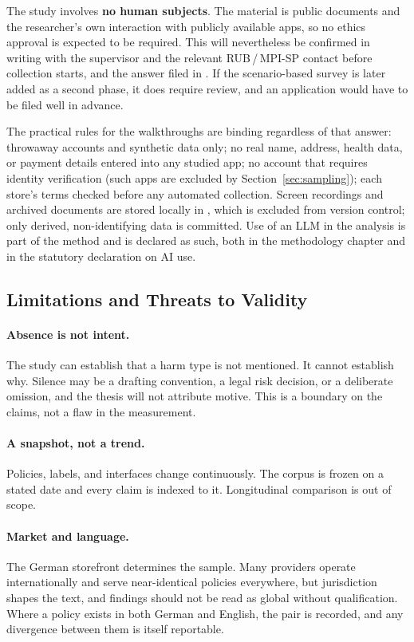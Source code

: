 The study involves \textbf{no human subjects}. The material is public documents
and the researcher's own interaction with publicly available apps, so no ethics
approval is expected to be required. This will nevertheless be confirmed in
writing with the supervisor and the relevant RUB\,/\,MPI-SP contact before
collection starts, and the answer filed in . If the
scenario-based survey is later added as a second phase, it does require review,
and an application would have to be filed well in advance.

The practical rules for the walkthroughs are binding regardless of that answer:
throwaway accounts and synthetic data only; no real name, address, health data,
or payment details entered into any studied app; no account that requires
identity verification (such apps are excluded by
Section~\ref{sec:sampling}); each store's terms checked before any automated
collection. Screen recordings and archived documents are stored locally in
, which is excluded from version control; only derived,
non-identifying data is committed. Use of an LLM in the analysis is part of the
method and is declared as such, both in the methodology chapter and in the
statutory declaration on AI use.

\subsection{Limitations and Threats to Validity}

\paragraph{Absence is not intent.}
The study can establish that a harm type is not mentioned. It cannot establish
why. Silence may be a drafting convention, a legal risk decision, or a
deliberate omission, and the thesis will not attribute motive. This is a
boundary on the claims, not a flaw in the measurement.

\paragraph{A snapshot, not a trend.}
Policies, labels, and interfaces change continuously. The corpus is frozen on a
stated date and every claim is indexed to it. Longitudinal comparison is out of
scope.

\paragraph{Market and language.}
The German storefront determines the sample. Many providers operate
internationally and serve near-identical policies everywhere, but jurisdiction
shapes the text, and findings should not be read as global without
qualification. Where a policy exists in both German and English, the pair is
recorded, and any divergence between them is itself reportable.

